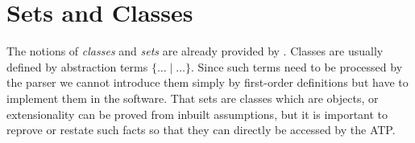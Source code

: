 \documentclass[english,11pt]{article}
\begin{document}
\begin{forthel}
\end{forthel}


\section{Sets and Classes}

The notions of \textit{classes} and \textit{sets} are already
provided by \Naproche. Classes are usually defined by
abstraction terms $\{\dots\mid\dots\}$. Since such terms need to be
processed by the parser we cannot introduce them simply by first-order
definitions but have to implement them in the software.
That sets are classes which are objects, or extensionality can be proved
from inbuilt assumptions, but it is important to reprove or restate such
facts so that they can directly be accessed by the ATP.
\end{document}
